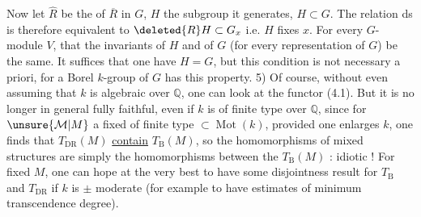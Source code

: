 Now let $\widehat R$ be the  of $\overline R$ in $G$, $H$ the subgroup it generates, $H\subset G$.  The relation ds is therefore equivalent to $\deleted{R}H\subset G_x$ i.e. $H$ fixes $x$.
For every $G$-module $V$, 
 that the invariants of $H$ and of $G$ (for every representation of $G$) be the same. It suffices that one have $H=G$, but this condition is not necessary a priori, for a Borel $k$-group of $G$ has this property.
5) Of course, without even assuming that $k$ is algebraic over $\mathbb Q$, one can look at the functor (4.1). But it is no longer in general fully faithful, even if $k$ is of finite type over $\mathbb Q$, since for $\unsure{\mathcal M|M}$ a fixed  of finite type $\subset\operatorname{Mot}(k)$, provided one enlarges $k$, one finds that  $T_{\mathrm{DR}}(M)$ \uline{contain} $T_{\mathrm B}(M)$, so the homomorphisms of mixed structures are simply the homomorphisms between the $T_{\mathrm B}(M)$ : idiotic !
For fixed $M$, one can hope at the very best to have some disjointness result for $T_{\mathrm B}$ and $T_{\mathrm{DR}}$ if $k$ is $\pm$ moderate (for example to have estimates of minimum transcendence degree).
